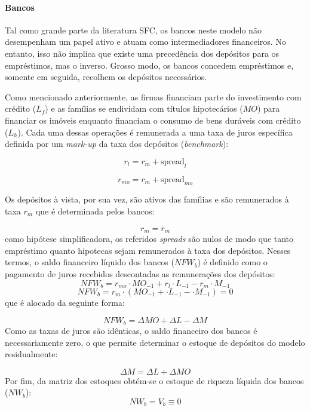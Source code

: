 \paragraph*{Bancos} Tal como grande parte da literatura SFC, os bancos neste modelo não desempenham um papel ativo e atuam como intermediadores financeiros. No entanto, isso não implica que existe uma precedência dos depósitos para os empréstimos, mas o inverso. Grosso modo, os bancos concedem empréstimos e, somente em seguida, recolhem os depósitos necessários. 

Como mencionado anteriormente, as firmas financiam parte do investimento com crédito ($L_f$) e as famílias se endividam com títulos hipotecários ($MO$) para financiar os imóveis enquanto financiam o consumo de bens duráveis com crédito ($L_h$). Cada uma dessas operações é remunerada a uma taxa de juros específica definida por um \textit{mark-up} da taxa dos depósitos (\textit{benchmark}):

\begin{equation}
    r_l = r_m + \text{spread}_l
\end{equation}

\begin{equation}
    r_{mo} = r_m + \text{spread}_{mo}
\end{equation}

Os depósitos à vista, por sua vez, são ativos das famílias e são remunerados à taxa $r_m$ que é determinada pelos bancos:

\begin{equation}
    r_m = \overline r_m
\end{equation}
como hipótese simplificadora, os referidos \textit{spreads} são nulos de modo que tanto empréstimo quanto hipotecas sejam remunerados à taxa dos depósitos. Nesses termos, o saldo financeiro líquido dos bancos ($NFW_b$) é definido como o pagamento de juros recebidos descontadas as remunerações dos depósitos:
\begin{equation}
    NFW_b = r_{mo}\cdot MO_{-1} + r_l\cdot L_{-1} - r_m\cdot M_{-1}
\end{equation}
$$
    NFW_b = r_{m}\cdot (MO_{-1} + \cdot L_{-1} - \cdot M_{-1}) = 0
$$
que é alocado da seguinte forma:

$$
NFW_b = \Delta MO + \Delta L - \Delta M
$$
Como as taxas de juros são idênticas, o saldo financeiro dos bancos é necessariamente zero, o que permite determinar o estoque de depósitos do modelo residualmente:

\begin{equation}
\label{_M}
    \Delta M = \Delta L + \Delta MO
\end{equation}
Por fim, da matriz dos estoques obtém-se o estoque de riqueza líquida dos bancos ($NW_b$):
\begin{equation}
    NW_b = V_b \equiv 0
\end{equation}


